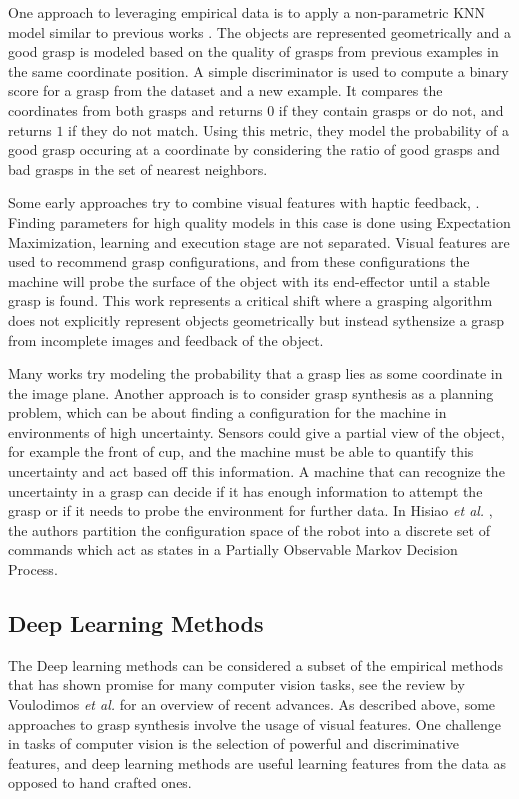 \documentclass{article}
\begin{document}
One approach to leveraging empirical data is to apply a non-parametric KNN
model similar to previous works \cite{zhang11,ciocarlie14}.
The objects are represented geometrically and a good grasp is modeled based
on the quality of grasps from previous examples in the same coordinate position.
A simple discriminator is used to compute a binary score for a grasp from the
dataset and a new example. It compares the coordinates from both grasps and
returns $0$ if they contain grasps or do not, and returns $1$ if they do not
match. Using this metric, they model the probability of a good grasp occuring
at a coordinate by considering the ratio of good grasps and bad grasps in the
set of nearest neighbors.

Some early approaches try to combine visual features with haptic feedback,
\cite{piater02,coelho01}. Finding parameters for high quality models in this
case is done using Expectation Maximization, learning and execution stage
are not separated. Visual
features are used to recommend grasp configurations, and from these configurations
the machine will probe the surface of the object with its end-effector until
a stable grasp is found. This work represents a critical shift where a grasping
algorithm does not explicitly represent objects geometrically but instead
sythensize a grasp from incomplete images and feedback of the object.

Many works try modeling the probability that a grasp lies as some coordinate
in the image plane. Another approach is to consider grasp synthesis as a
planning problem, which can be about finding a configuration for the machine
in environments of high uncertainty. Sensors could
give a partial view of the object, for example the front of cup, and the machine
must be able to quantify this uncertainty and act based off this information.
A machine that can recognize the uncertainty in a grasp can decide if it has
enough information to attempt the grasp or if it needs to probe the environment
for further data. In Hisiao \textit{et al.} \cite{hsiao07}, the authors
partition the configuration space of the robot into a discrete set of commands
which act as states in a Partially Observable Markov Decision Process.

\subsection{Deep Learning Methods}
The Deep learning methods can be considered a subset of the empirical methods
that has shown promise for many computer vision tasks, see the review
by Voulodimos \textit{et al.} \cite{voulodimos18} for an overview of recent
advances. As described above, some approaches to grasp synthesis involve the
usage of visual features. One challenge in tasks of computer vision is the
selection of powerful and discriminative features, and deep learning methods
are useful learning features from the data as opposed to hand crafted ones.
\end{document}
